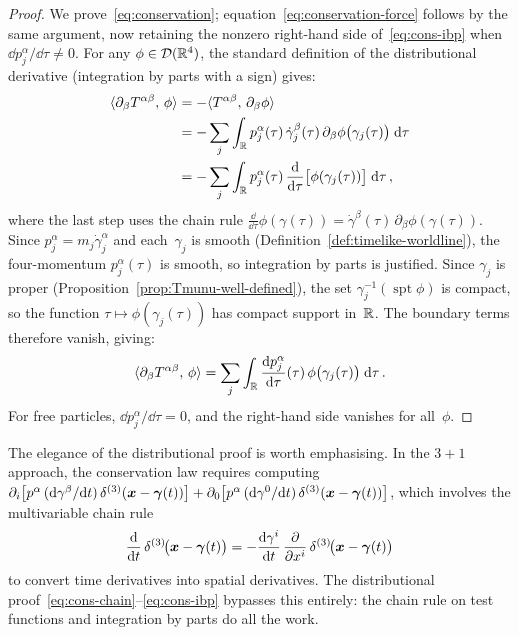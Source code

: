 \begin{proof}
  We prove~\eqref{eq:conservation};
  equation~\eqref{eq:conservation-force} follows by the same
  argument, now retaining the nonzero right-hand side
  of~\eqref{eq:cons-ibp} when $\dd p_j^\alpha/\dd\tau \neq 0$.
  For any $\phi \in \mathcal{D}(\mathbb{R}^{4})$, the standard definition
  of the distributional derivative (integration by parts with a
  sign) gives:
  \begin{align}
    \langle \partial_\beta T^{\alpha\beta},\,\phi\rangle
      &= -\langle T^{\alpha\beta},\,\partial_\beta\phi\rangle
      \notag\\
      &= -\sum_j \int_{\mathbb{R}} p_j^\alpha(\tau)\,
        \dot\gamma_j^\beta(\tau)\,
        \partial_\beta\phi\bigl(\gamma_j(\tau)\bigr)\;\mathrm{d}\tau
      \notag\\
      &= -\sum_j \int_{\mathbb{R}} p_j^\alpha(\tau)\,
        \frac{\mathrm{d}}{\mathrm{d}\tau}\bigl[\phi(\gamma_j(\tau))\bigr]
        \;\mathrm{d}\tau\,,
        \label{eq:cons-chain}
  \end{align}
  where the last step uses the chain rule
  $\frac{\dd}{\dd\tau}\phi(\gamma(\tau))
  = \dot\gamma^\beta(\tau)\,\partial_\beta\phi(\gamma(\tau))$.
  Since $p_j^\alpha = m_j\dot\gamma_j^\alpha$ and each~$\gamma_j$
  is smooth (Definition~\ref{def:timelike-worldline}), the
  four-momentum $p_j^\alpha(\tau)$ is smooth, so integration by
  parts is justified.  Since $\gamma_j$ is proper
  (Proposition~\ref{prop:Tmunu-well-defined}), the set
  $\gamma_j^{-1}(\operatorname{spt}\phi)$ is compact, so the
  function $\tau \mapsto \phi(\gamma_j(\tau))$ has compact support
  in~$\mathbb{R}$.  The boundary terms therefore vanish, giving:
  \begin{equation}\label{eq:cons-ibp}
    \langle \partial_\beta T^{\alpha\beta},\,\phi\rangle
      = \sum_j \int_{\mathbb{R}}
        \frac{\mathrm{d} p_j^\alpha}{\mathrm{d}\tau}(\tau)\,
        \phi\bigl(\gamma_j(\tau)\bigr)\;\mathrm{d}\tau\,.
  \end{equation}
  For free particles, $\dd p_j^\alpha/\dd\tau = 0$, and the
  right-hand side vanishes for all~$\phi$.
\end{proof}

\begin{remark}
  The elegance of the distributional proof is worth
  emphasising.  In the $3{+}1$ approach, the conservation law
  requires computing
  $\partial_i\bigl[p^\alpha\,(\mathrm{d}\gamma^\beta/\mathrm{d} t)\,
  \delta^{(3)}(\boldsymbol{x} - \boldsymbol{\gamma}(t))\bigr]
  + \partial_0\bigl[p^\alpha\,(\mathrm{d}\gamma^0/\mathrm{d} t)\,
  \delta^{(3)}(\boldsymbol{x} - \boldsymbol{\gamma}(t))\bigr]$,
  which involves the multivariable chain rule
  \[
    \frac{\mathrm{d}}{\mathrm{d} t}\,\delta^{(3)}\!\bigl(\boldsymbol{x}
    - \boldsymbol{\gamma}(t)\bigr)
    = -\frac{\mathrm{d}\gamma^i}{\mathrm{d} t}\,
      \frac{\partial}{\partial x^i}\,
      \delta^{(3)}\!\bigl(\boldsymbol{x}
      - \boldsymbol{\gamma}(t)\bigr)
  \]
  to convert time derivatives into spatial derivatives.  The
  distributional proof~\eqref{eq:cons-chain}--\eqref{eq:cons-ibp}
  bypasses this entirely: the chain rule on test functions and
  integration by parts do all the work.
\end{remark}

